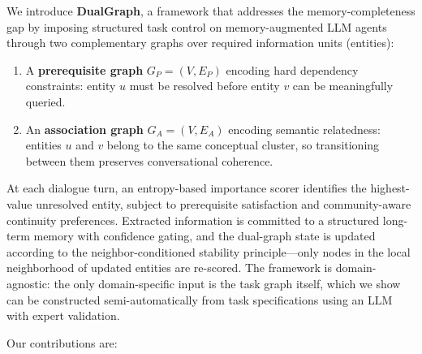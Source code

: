 \documentclass[11pt,a4paper]{article}
\begin{document}
We introduce \textbf{DualGraph}, a framework that addresses the
memory-completeness gap by imposing structured task control on
memory-augmented LLM agents through two complementary graphs over required
information units (entities):

\begin{enumerate}[noitemsep]
  \item A \textbf{prerequisite graph} $G_P = (V, E_P)$ encoding hard
        dependency constraints: entity $u$ must be resolved before entity $v$
        can be meaningfully queried.
  \item An \textbf{association graph} $G_A = (V, E_A)$ encoding semantic
        relatedness: entities $u$ and $v$ belong to the same conceptual
        cluster, so transitioning between them preserves conversational
        coherence.
\end{enumerate}

\noindent At each dialogue turn, an entropy-based importance scorer identifies
the highest-value unresolved entity, subject to prerequisite satisfaction and
community-aware continuity preferences. Extracted information is committed to
a structured long-term memory with confidence gating, and the dual-graph state
is updated according to the neighbor-conditioned stability principle---only
nodes in the local neighborhood of updated entities are re-scored. The
framework is domain-agnostic: the only domain-specific input is the task graph
itself, which we show can be constructed semi-automatically from task
specifications using an LLM with expert validation.

Our contributions are:
\end{document}

